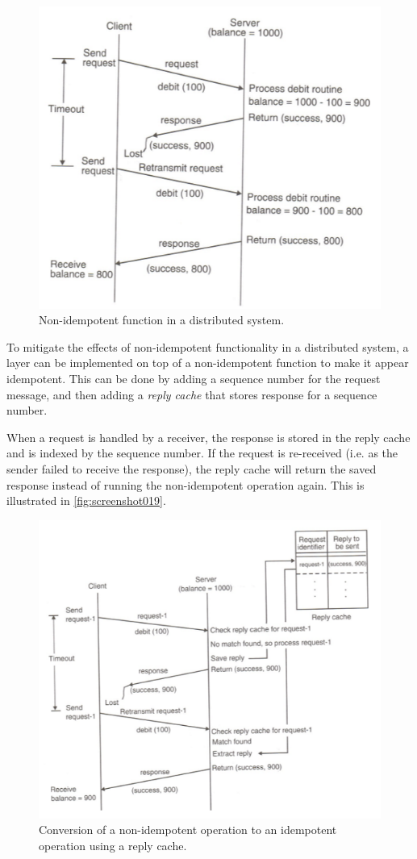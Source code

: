 \begin{figure}[h]
\centering
\includegraphics[width=0.55\linewidth]{figures/screenshot018}
\caption{Non-idempotent function in a distributed system.}
\label{fig:screenshot018}
\end{figure}

To mitigate the effects of non-idempotent functionality in a distributed system, a layer can be implemented on top of a non-idempotent function to make it appear idempotent. This can be done by adding a sequence number for the request message, and then adding a \textit{reply cache} that stores response for a sequence number.

When a request is handled by a receiver, the response is stored in the reply cache and is indexed by the sequence number. If the request is re-received (i.e. as the sender failed to receive the response), the reply cache will return the saved response instead of running the non-idempotent operation again. This is illustrated in \autoref{fig:screenshot019}.

\begin{figure}
\centering
\includegraphics[width=0.7\linewidth]{figures/screenshot019}
\caption[Non-idempotent to idempotent using reply cache]{Conversion of a non-idempotent operation to an idempotent operation using a reply cache.}
\label{fig:screenshot019}
\end{figure}

